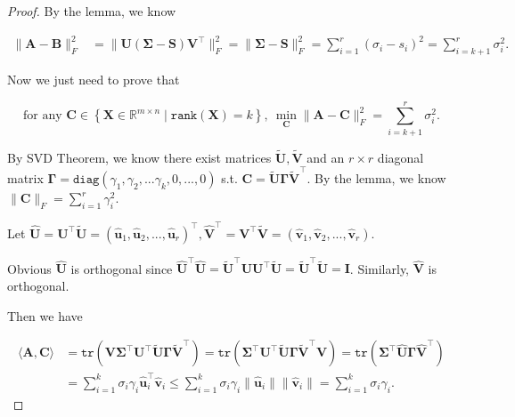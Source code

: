 \documentclass{article}
\newcommand{\set}[1]{\left\{#1\right\}}
\newcommand{\bd}[1]{\boldsymbol{#1}}
\begin{document}
\begin{proof}
    \vspace{3em} \hspace{1.3em}
    By the lemma, we know 
    
    \vspace{-2.5em}
    \begin{align*}
        \|\bd{A}-\bd{B}\|_F^2 & = \|\bd{U}\left(\bd{\Sigma}-\bd{S}\right)\bd{V}^\top\|_F^2 = \|\bd{\Sigma}-\bd{S}\|_F^2 = \sum_{i=1}^r (\sigma_i-s_i)^2 = \sum_{i=k+1}^r \sigma_i^2.
    \end{align*}

    \hspace{1.3em}
    Now we just need to prove that

    \vspace{-1em}
    $$\text{for any }\bd{C}\in\set{\bd{X}\in\mathbb{R}^{m\times n}\mid\mathtt{rank}(\bd{X})=k},\ \underset{\bd{C}}{\min}\|\bd{A}-\bd{C}\|_F^2=\sum_{i=k+1}^r \sigma_i^2.$$
    
    \vspace{-0.5em} \hspace{1.3em}
    By SVD Theorem, we know there exist matrices $\widetilde{\bd{U}}, \widetilde{\bd{V}}$ and an $r\times r$ diagonal matrix $\bd{\Gamma}=\mathtt{diag}\left(\gamma_1,\gamma_2,...\gamma_k,0,...,0\right)$ s.t. $\bd{C}=\widetilde{\bd{U}}\bd{\Gamma}\widetilde{\bd{V}}^\top$. By the lemma, we know $\|\bd{C}\|_F = \sum_{i=1}^r \gamma_i^2$.
    
    \hspace{1.3em}
    Let $\hat{\bd{U}}=\bd{U}^\top\widetilde{\bd{U}} = \left(\hat{\bd{u}}_1,\hat{\bd{u}}_2,...,\hat{\bd{u}}_r\right)^\top, \hat{\bd{V}}^\top = \bd{V}^\top \widetilde{\bd{V}} = \left(\hat{\bd{v}}_1,\hat{\bd{v}}_2,...,\hat{\bd{v}}_r\right)$.

    \hspace{1.3em}
    Obvious $\hat{\bd{U}}$ is orthogonal since $\hat{\bd{U}}^\top\hat{\bd{U}}=\widetilde{\bd{U}}^\top\bd{U}\bd{U}^\top\widetilde{\bd{U}} = \widetilde{\bd{U}}^\top\widetilde{\bd{U}} = \bd{I}$. Similarly, $\hat{\bd{V}}$ is orthogonal.

    \hspace{1.3em}
    Then we have

    \vspace{-2em}
    \begin{align*}
        \langle \bd{A}, \bd{C} \rangle & = \mathtt{tr}\left(\bd{V}\bd{\Sigma}^\top\bd{U}^\top\widetilde{\bd{U}}\bd{\Gamma}\widetilde{\bd{V}}^\top\right) = \mathtt{tr}\left(\bd{\Sigma}^\top\bd{U}^\top\widetilde{\bd{U}}\bd{\Gamma}\widetilde{\bd{V}}^\top\bd{V}\right) = \mathtt{tr}\left(\bd{\Sigma}^\top\hat{\bd{U}}\bd{\Gamma}\hat{\bd{V}}^\top\right) \\
        & = \sum_{i=1}^k \sigma_i\gamma_i\hat{\bd{u}}_i^\top \hat{\bd{v}}_i 
        \le \sum_{i=1}^k \sigma_i\gamma_i\|\hat{\bd{u}}_i\|\|\hat{\bd{v}}_i\| = \sum_{i=1}^k \sigma_i\gamma_i.
    \end{align*}


\end{proof}
\end{document}
